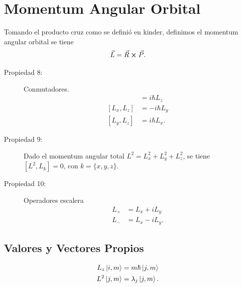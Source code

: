 \section{Momentum Angular Orbital}
Tomando el producto cruz como se definió en kinder, definimos el momentum angular orbital se tiene
\begin{equation}
	\vec{L} = \vec{R} \cp \vec{P}.
\end{equation}


\begin{description}
	\item[Propiedad 8: ] Conmutadores.
		\begin{align}
			[L_x ,L_y] &= i\hbar L_z \\
			[L_x ,L_z] &= -i\hbar L_y \\
			[L_y ,L_z] &= i\hbar L_x .
		\end{align}
	\item[Propiedad 9: ] Dado el momentum angular total $L^2 = L_x ^2 + L_y ^2 + L_z ^2$, se tiene $[L^2 ,L_k] = 0$, con $k = \{ x,y,z \}$.
	\item[Propiedad 10: ] Operadores escalera
		\begin{align*}
			L_+ &= L_x + iL_y \\
			L_- &= L_x - iL_y.
		\end{align*}
\end{description}

\subsection{Valores y Vectores Propios}
\begin{align}
	L_z \ket{i,m} &=m\hbar \ket{j,m} \\
	L^2 \ket{j,m} &= \lambda _j \ket{j,m} .
\end{align}


